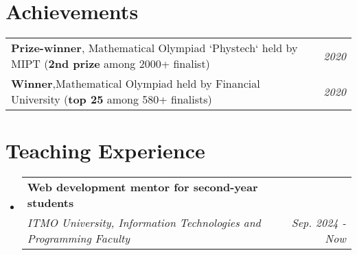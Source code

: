 \documentclass[letterpaper,10pt]{article}
\makeatletter
\newcommand{\resumeSubheading}[4]{
    \vspace{-1pt}\item
        \begin{tabular*}{0.97\textwidth}{l@{\extracolsep{\fill}}r}
            \textbf{#3} & \textcolor{mygray}{#2} \\
            \textit{\small#1} & \textcolor{mygray}{\textit{\small #4}} \\
        \end{tabular*}\vspace{-5pt}
}
\newcommand{\resumeSubHeadingListStart}{\begin{itemize}[leftmargin=*]}
\newcommand{\resumeSubHeadingListEnd}{\end{itemize}}
\makeatother
\begin{document}
\vspace{-1pt}

\section{Achievements}
    \resumeSubHeadingListStart
        \begin{tabular}{ll}
            \textbf{Prize-winner}, \quad Mathematical Olympiad `Phystech` held by MIPT (\textbf{2nd prize} among 2000+ finalist) & \quad\quad\quad\quad\quad\quad\quad\quad \textit{\small 2020}\\
            \textbf{Winner},\quad\quad\quad\quad Mathematical Olympiad held by Financial University (\textbf{top 25} among 580+ finalists) & \quad\quad\quad\quad\quad\quad\quad\quad \textit{\small 2020} 
        \end{tabular}
    \resumeSubHeadingListEnd


\vspace{0.005pt}
\vspace{-1pt}

\section{Teaching Experience}
    \resumeSubHeadingListStart
        \resumeSubheading
            {ITMO University, Information Technologies and Programming Faculty}{}
            {\textbf{Web development} mentor for second-year students}{Sep. 2024 - Now}
  \resumeSubHeadingListEnd



    
\end{document}
